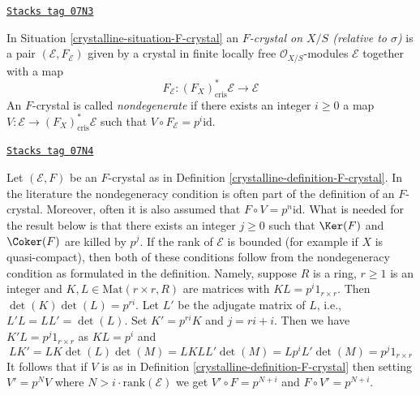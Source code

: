 \begin{definition}[F crystal]
\label{crystalline-definition-F-crystal}
\href{https://stacks.math.columbia.edu/tag/07N3}{\texttt{Stacks tag 07N3}}

In Situation \ref{crystalline-situation-F-crystal} an {\it $F$-crystal on $X/S$
(relative to $\sigma$)} is a pair $(\mathcal{E}, F_\mathcal{E})$
given by a crystal in finite locally free $\mathcal{O}_{X/S}$-modules
$\mathcal{E}$ together with a map
$$
F_\mathcal{E} : (F_X)_{\text{cris}}^*\mathcal{E} \longrightarrow \mathcal{E}
$$
An $F$-crystal is called {\it nondegenerate} if there exists an integer
$i \geq 0$ a map $V : \mathcal{E} \to (F_X)_{\text{cris}}^*\mathcal{E}$
such that $V \circ F_{\mathcal{E}} = p^i \text{id}$.
\end{definition}

\begin{remark}
\label{crystalline-remark-F-crystal-variants}
\href{https://stacks.math.columbia.edu/tag/07N4}{\texttt{Stacks tag 07N4}}

Let $(\mathcal{E}, F)$ be an $F$-crystal as in
Definition \ref{crystalline-definition-F-crystal}.
In the literature the nondegeneracy condition is often part of the
definition of an $F$-crystal. Moreover, often it is also assumed that
$F \circ V = p^n\text{id}$. What is needed for the result below is
that there exists an integer $j \geq 0$ such that $\Ker(F)$ and
$\Coker(F)$ are killed by $p^j$. If the rank of $\mathcal{E}$
is bounded (for example if $X$ is quasi-compact), then both of these
conditions follow from the nondegeneracy condition as formulated in
the definition. Namely, suppose $R$ is a ring, $r \geq 1$ is an integer and
$K, L \in \text{Mat}(r \times r, R)$ are matrices with
$K L = p^i 1_{r \times r}$. Then $\det(K)\det(L) = p^{ri}$.
Let $L'$ be the adjugate matrix of $L$, i.e.,
$L' L = L L' = \det(L)$. Set $K' = p^{ri} K$ and $j = ri + i$.
Then we have $K' L = p^j 1_{r \times r}$ as $K L = p^i$ and
$$
L K' = L K \det(L) \det(M) = L K L L' \det(M) = L p^i L' \det(M) =
p^j 1_{r \times r}
$$
It follows that if $V$ is as in Definition \ref{crystalline-definition-F-crystal}
then setting $V' = p^N V$ where $N > i \cdot \text{rank}(\mathcal{E})$
we get $V' \circ F = p^{N + i}$ and $F \circ V' = p^{N + i}$.
\end{remark}

